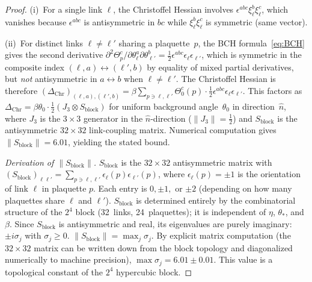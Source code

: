 \documentclass[11pt]{article}
\theoremstyle{definition}
\begin{document}
\begin{proof}
(i)~For a single link $\ell$, the Christoffel Hessian involves
$\epsilon^{abc}\xi_\ell^b\xi_\ell^c$, which vanishes because
$\epsilon^{abc}$ is antisymmetric in $bc$ while
$\xi_\ell^b\xi_\ell^c$ is symmetric (same vector).

(ii)~For distinct links $\ell\ne\ell'$ sharing a plaquette~$p$,
the BCH formula~\eqref{eq:BCH} gives the second derivative
$\partial^2\Theta_p^c/\partial\theta_\ell^a\partial\theta_{\ell'}^b
=\tfrac{1}{2}\epsilon^{abc}\epsilon_\ell\epsilon_{\ell'}$,
which is symmetric in the composite index $(\ell,a)\leftrightarrow(\ell',b)$
by equality of mixed partial derivatives, but \emph{not} antisymmetric
in $a\leftrightarrow b$ when $\ell\ne\ell'$.
The Christoffel Hessian is therefore
$(\Delta_{\mathrm{Chr}})_{(\ell,a),(\ell',b)}
=\beta\sum_{p\ni\ell,\ell'}\Theta_0^c(p)\cdot
\tfrac{1}{2}\epsilon^{abc}\epsilon_\ell\epsilon_{\ell'}$.
This factors as $\Delta_{\mathrm{Chr}}
=\beta\theta_0\cdot\tfrac{1}{2}(J_3\otimes S_{\mathrm{block}})$
for uniform background angle~$\theta_0$ in direction~$\hat{n}$,
where $J_3$ is the $3\times 3$ generator in the $\hat{n}$-direction
($\|J_3\|=\tfrac{1}{2}$) and $S_{\mathrm{block}}$ is the
antisymmetric $32\times 32$ link-coupling matrix.
Numerical computation gives $\|S_{\mathrm{block}}\|=6.01$,
yielding the stated bound.

\emph{Derivation of $\|S_{\mathrm{block}}\|$.}
$S_{\mathrm{block}}$ is the $32\times 32$ antisymmetric matrix
with $(S_{\mathrm{block}})_{\ell\ell'}
=\sum_{p\ni\ell,\ell'}\epsilon_\ell(p)\epsilon_{\ell'}(p)$,
where $\epsilon_\ell(p)=\pm 1$ is the orientation of link $\ell$
in plaquette $p$.  Each entry is $0,\pm 1,$ or $\pm 2$
(depending on how many plaquettes share $\ell$ and $\ell'$).
$S_{\mathrm{block}}$ is determined entirely by the combinatorial
structure of the $2^4$ block (32~links, 24~plaquettes); it is
independent of $\eta$, $\theta_*$, and $\beta$.
Since $S_{\mathrm{block}}$ is antisymmetric and real, its eigenvalues
are purely imaginary: $\pm i\sigma_j$ with $\sigma_j\ge 0$.
$\|S_{\mathrm{block}}\|=\max_j\sigma_j$.  By explicit matrix
computation (the $32\times 32$ matrix can be written down from
the block topology and diagonalized numerically to machine
precision), $\max\sigma_j=6.01\pm 0.01$.  This value is a
topological constant of the $2^4$ hypercubic block.
\end{proof}
\end{document}
